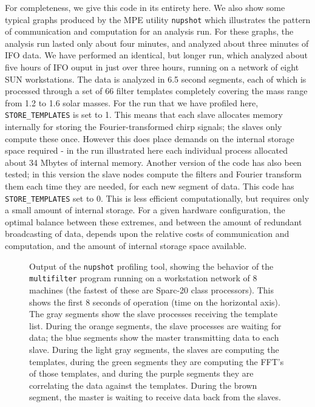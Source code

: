 For completeness, we give this code in its entirety here.  We also show
some typical graphs produced by the MPE utility {\tt nupshot} which
illustrates the pattern of communication and computation for an
analysis run.  For these graphs, the analysis run lasted only about
four minutes, and analyzed about three minutes of IFO data.  We have
performed an identical, but longer run, which analyzed about five hours
of IFO ouput in just over three hours, running on a network of eight
SUN workstations.  The data is analyzed in 6.5 second segments, each of
which is processed through a set of 66 filter templates completely
covering the mass range from 1.2 to 1.6 solar masses.  For the run that
we have profiled here, {\tt STORE\_TEMPLATES} is set to 1.  This means
that each slave allocates memory internally for storing the
Fourier-transformed chirp signals; the slaves only compute these once.
However this does place demands on the internal storage space required
- in the run illustrated here each individual process allocated about
34 Mbytes of internal memory.  Another version of the code has also
been tested; in this version the slave nodes compute the filters and
Fourier transform them each time they are needed, for each new segment
of data.  This code has {\tt STORE\_TEMPLATES}  set to 0.  This is less
efficient computationally, but requires only a small amount of internal
storage.  For a given hardware configuration, the optimal balance
between these extremes, and between the amount of redundant
broadcasting of data, depends upon the relative costs of communication
and computation, and the amount of internal storage space available.

\begin{figure}
\caption{\label{f:nupshot1} Output of the {\tt nupshot} profiling tool,
showing the behavior of the {\tt multifilter} program running on a
workstation network of 8 machines (the fastest of these are Sparc-20
class processors).  This shows the first 8 seconds of operation (time
on the horizontal axis).  The gray segments show the slave processes
receiving the template list.  During the orange segments, the slave
processes are waiting for data; the blue segments show the master
transmitting data to each slave.  During the light gray segments, the
slaves are computing the templates, during the green segments they are
computing the FFT's of those templates, and during the purple segments
they are correlating the data against the templates.  During the brown
segment, the master is waiting to receive data back from the slaves. }
\end{figure}


